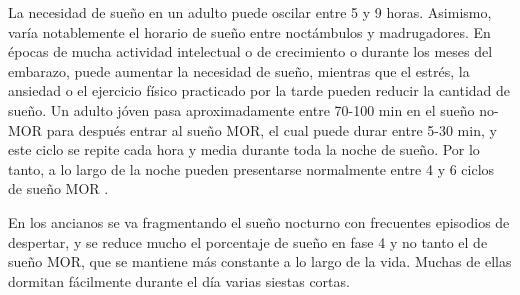 La necesidad de sue\~no en un adulto puede oscilar entre 5 y 9 horas. Asimismo, var\'ia 
notablemente el horario de sueño entre noct\'ambulos y madrugadores. En \'epocas de mucha actividad 
intelectual o de crecimiento o durante los meses del embarazo, puede aumentar la necesidad de 
sue\~no, mientras que el estr\'es, la ansiedad o el ejercicio f\'isico practicado por la tarde 
pueden reducir la cantidad de sue\~no. 
Un adulto j\'oven pasa aproximadamente entre 70-100 min en el sue\~no no-MOR para despu\'es entrar 
al sue\~no MOR, el cual puede durar entre 5-30 min, y este ciclo se repite cada hora y media 
durante toda la noche de sue\~no. 
Por lo tanto, a lo largo de la noche pueden presentarse normalmente entre 4 y 6 ciclos de 
sue\~no MOR \cite{CarrilloMora}.

En los ancianos se va fragmentando el sue\~no nocturno con frecuentes episodios de despertar, y se 
reduce mucho el porcentaje de sue\~no en fase 4 y no tanto el de sue\~no MOR, que se mantiene 
m\'as constante a lo largo de la vida. 
Muchas de ellas dormitan f\'acilmente durante el d\'ia varias siestas cortas.


%
 
